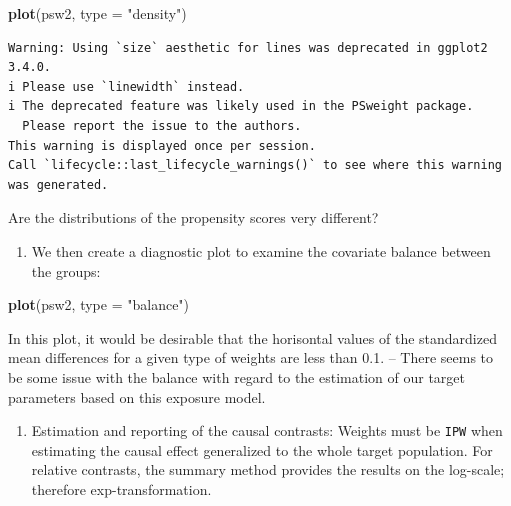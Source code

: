 \documentclass[
]{book}
\newenvironment{Shaded}{\begin{snugshade}}{\end{snugshade}}
\newcommand{\AttributeTok}[1]{\textcolor[rgb]{0.13,0.29,0.53}{#1}}
\newcommand{\FunctionTok}[1]{\textcolor[rgb]{0.13,0.29,0.53}{\textbf{#1}}}
\newcommand{\NormalTok}[1]{#1}
\newcommand{\StringTok}[1]{\textcolor[rgb]{0.31,0.60,0.02}{#1}}
\providecommand{\tightlist}{%
  \setlength{\itemsep}{0pt}\setlength{\parskip}{0pt}}
\begin{document}
\begin{Shaded}
\begin{Highlighting}[]
\FunctionTok{plot}\NormalTok{(psw2, }\AttributeTok{type =} \StringTok{"density"}\NormalTok{)}
\end{Highlighting}
\end{Shaded}

\begin{verbatim}
Warning: Using `size` aesthetic for lines was deprecated in ggplot2 3.4.0.
i Please use `linewidth` instead.
i The deprecated feature was likely used in the PSweight package.
  Please report the issue to the authors.
This warning is displayed once per session.
Call `lifecycle::last_lifecycle_warnings()` to see where this warning was generated.
\end{verbatim}

Are the distributions of the propensity scores very different?

\begin{enumerate}
\def\labelenumi{\arabic{enumi}.}
\setcounter{enumi}{2}
\tightlist
\item
  We then create a diagnostic plot to examine the covariate balance
  between the groups:
\end{enumerate}

\begin{Shaded}
\begin{Highlighting}[]
\FunctionTok{plot}\NormalTok{(psw2, }\AttributeTok{type =} \StringTok{"balance"}\NormalTok{)}
\end{Highlighting}
\end{Shaded}

In this plot, it would be desirable that the horisontal values of the
standardized mean differences for a given type of weights are less than
0.1. -- There seems to be some issue with the balance with regard to
the estimation of our target parameters based on this exposure model.

\begin{enumerate}
\def\labelenumi{\arabic{enumi}.}
\setcounter{enumi}{3}
\tightlist
\item
  Estimation and reporting of the causal contrasts: Weights must be
  \texttt{IPW} when estimating the causal effect generalized to the whole
  target population. For relative contrasts, the summary method
  provides the results on the log-scale; therefore
  exp-transformation.
\end{enumerate}
\end{document}

